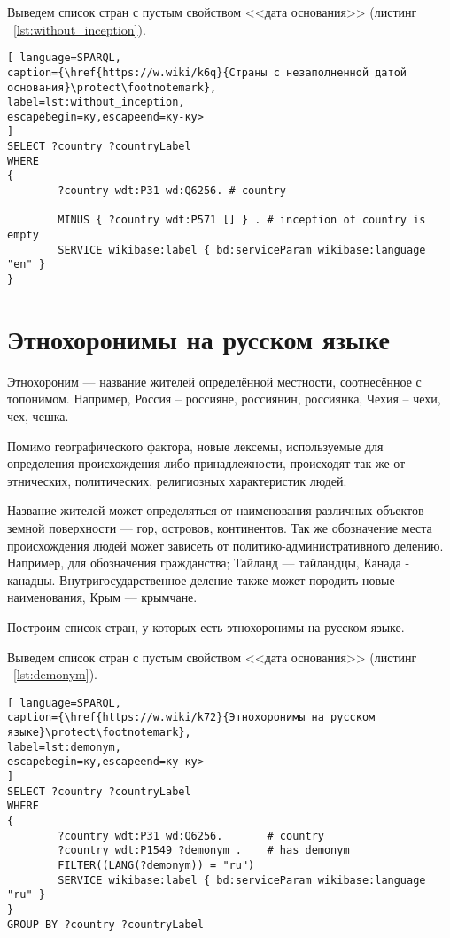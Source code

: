 Выведем список стран с пустым свойством <<дата основания>> (листинг ~\ref{lst:without_inception}).

\begin{lstlisting}[ language=SPARQL, 
caption={\href{https://w.wiki/k6q}{Страны с незаполненной датой основания}\protect\footnotemark},
label=lst:without_inception, 
escapebegin=ку,escapeend=ку-ку>
]
SELECT ?country ?countryLabel 
WHERE
{
		?country wdt:P31 wd:Q6256. # country
		
		MINUS { ?country wdt:P571 [] } . # inception of country is empty
		SERVICE wikibase:label { bd:serviceParam wikibase:language "en" }
}
\end{lstlisting}


\section{Этнохоронимы на русском языке}

Этнохороним — название жителей определённой местности, соотнесённое с топонимом. Например, Россия – россияне, россиянин, россиянка, Чехия – чехи, чех, чешка.

Помимо географического фактора, новые лексемы, используемые для определения происхождения либо принадлежности, происходят так же от этнических, политических, религиозных характеристик людей\cite{country_2}. 

Название жителей может определяться от наименования различных объектов земной поверхности — гор, островов, континентов. Так же обозначение места происхождения людей может зависеть от политико-административного делению. Например, для обозначения гражданства; Тайланд — тайландцы, Канада - канадцы. Внутригосударственное деление также может породить новые наименования, Крым — крымчане.

Построим список стран, у которых есть этнохоронимы на русском языке.

Выведем список стран с пустым свойством <<дата основания>> (листинг ~\ref{lst:demonym}).

\begin{lstlisting}[ language=SPARQL, 
caption={\href{https://w.wiki/k72}{Этнохоронимы на русском языке}\protect\footnotemark},
label=lst:demonym, 
escapebegin=ку,escapeend=ку-ку>
]
SELECT ?country ?countryLabel 
WHERE
{
		?country wdt:P31 wd:Q6256.       # country
		?country wdt:P1549 ?demonym .    # has demonym
		FILTER((LANG(?demonym)) = "ru")
		SERVICE wikibase:label { bd:serviceParam wikibase:language "ru" }
}
GROUP BY ?country ?countryLabel
\end{lstlisting}

